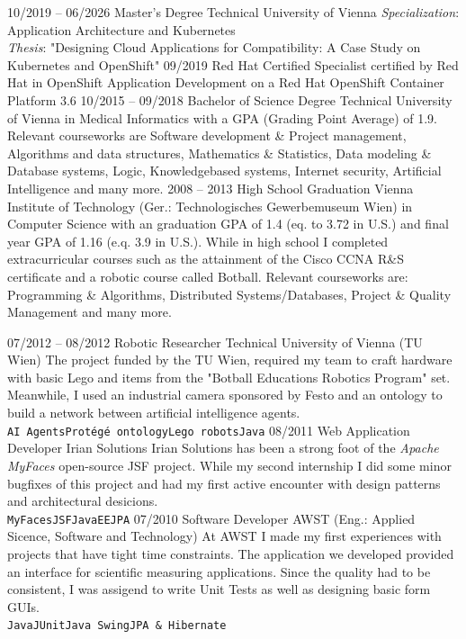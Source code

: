 \documentclass[9pt]{developercv} %
\begin{document}
\begin{entrylist}
	\entry
		{10/2019 -- 06/2026}
		{Master's Degree}
		{Technical University of Vienna}
		{\textit{Specialization}: Application Architecture and Kubernetes \\ 
			\textit{Thesis}: "Designing Cloud Applications for Compatibility: A Case Study on Kubernetes and OpenShift"
		}
	\entry
		{09/2019}
		{Red Hat Certified Specialist}
		{certified by Red Hat}
		{in OpenShift Application Development on a Red Hat OpenShift Container Platform 3.6}
	\entry
		{10/2015 -- 09/2018}
		{Bachelor of Science Degree}
		{Technical University of Vienna}
		{in Medical Informatics with a GPA (Grading Point Average) of 1.9. Relevant courseworks are Software development \& Project management, Algorithms and data structures, Mathematics \& Statistics, Data modeling \& Database systems, Logic, Knowledgebased systems, Internet security, Artificial Intelligence and many more.}
	\entry
		{2008 -- 2013}
		{High School Graduation}
		{Vienna Institute of Technology (Ger.: Technologisches Gewerbemuseum Wien)}
		{in Computer Science with an graduation GPA of 1.4 (eq. to 3.72 in U.S.) and final year GPA of 1.16 (e.q. 3.9 in U.S.). While in high school I completed extracurricular courses such as the  attainment of the Cisco CCNA R\&S certificate and a robotic course called Botball.  Relevant courseworks are: Programming \& Algorithms, Distributed Systems/Databases, Project \& Quality Management and many more.}
\end{entrylist}


\begin{entrylist}
	\entry
	{07/2012 -- 08/2012}
	{Robotic Researcher}
	{Technical University of Vienna (TU Wien)}
	{The project funded by the TU Wien, required my team to craft hardware with basic Lego and items from the "Botball Educations Robotics Program" set. Meanwhile, I used an industrial camera sponsored by Festo and an ontology to build a network between artificial intelligence agents.\\ 
		\texttt{AI Agents}\slashsep\texttt{Protégé ontology}\slashsep\texttt{Lego robots}\slashsep\texttt{Java}}
	\entry
	{08/2011}
	{Web Application Developer}
	{Irian Solutions}
	{Irian Solutions has been a strong foot of the \textit{Apache MyFaces} open-source JSF project. While my second internship I did some minor bugfixes of this project and had my first active encounter with design patterns and architectural desicions.\\ 
		\texttt{MyFaces}\slashsep\texttt{JSF}\slashsep\texttt{JavaEE}\slashsep\texttt{JPA}}
	\entry
	{07/2010}
	{Software Developer}
	{AWST (Eng.: Applied Sicence, Software and Technology)}
	{At AWST I made my first experiences with projects that have tight time constraints. The application we developed provided an interface for scientific measuring applications. Since the quality had to be consistent, I was assigend to write Unit Tests as well as designing basic form GUIs.  \\ 
	\texttt{Java}\slashsep\texttt{JUnit}\slashsep\texttt{Java Swing}\slashsep\texttt{JPA \& Hibernate}}
\end{entrylist}
\end{document}
